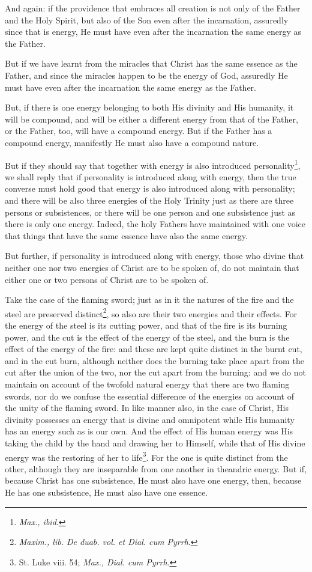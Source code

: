 And again: if the providence that embraces all creation is not only of the Father and the Holy Spirit, but also of the Son even after the incarnation, assuredly since that is energy, He must have even after the incarnation the same energy as the Father.

But if we have learnt from the miracles that Christ has the same essence as the Father, and since the miracles happen to be the energy of God, assuredly He must have even after the incarnation the same energy as the Father.

But, if there is one energy belonging to both His divinity and His humanity, it will be compound, and will be either a different energy from that of the Father, or the Father, too, will have a compound energy. But if the Father has a compound energy, manifestly He must also have a compound nature.

But if they should say that together with energy is also introduced personality\footnote{\emph{Max., ibid}.}, we shall reply that if personality is introduced along with energy, then the true converse must hold good that energy is also introduced along with personality; and there will be also three energies of the Holy Trinity just as there are three persons or subsistences, or there will be one person and one subsistence just as there is only one energy. Indeed, the holy Fathers have maintained with one voice that things that have the same essence have also the same energy.

But further, if personality is introduced along with energy, those who divine that neither one nor two energies of Christ are to be spoken of, do not maintain that either one or two persons of Christ are to be spoken of.

Take the case of the flaming sword; just as in it the natures of the fire and the steel are preserved distinct\footnote{\emph{Maxim., lib. De duab. vol. et Dial. cum Pyrrh}.}, so also are their two energies and their effects. For the energy of the steel is its cutting power, and that of the fire is its burning power, and the cut is the effect of the energy of the steel, and the burn is the effect of the energy of the fire: and these are kept quite distinct in the burnt cut, and in the cut burn, although neither does the burning take place apart from the cut after the union of the two, nor the cut apart from the burning: and we do not maintain on account of the twofold natural energy that there are two flaming swords, nor do we confuse the essential difference of the energies on account of the unity of the flaming sword. In like manner also, in the case of Christ, His divinity possesses an energy that is divine and omnipotent while His humanity has an energy such as is our own. And the effect of His human energy was His taking the child by the hand and drawing her to Himself, while that of His divine energy was the restoring of her to life\footnote{St. Luke viii. 54; \emph{Max., Dial. cum Pyrrh}.}. For the one is quite distinct from the other, although they are inseparable from one another in theandric energy. But if, because Christ has one subsistence, He must also have one energy, then, because He has one subsistence, He must also have one essence.

